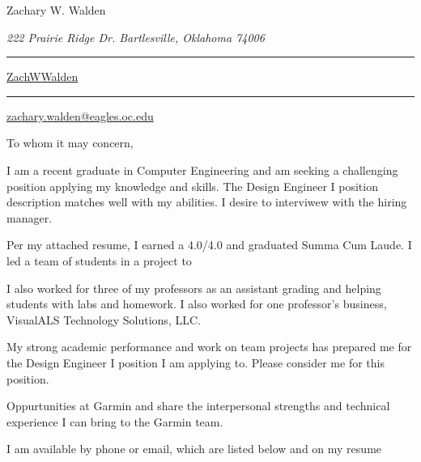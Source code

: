 \documentclass{article}
\newcommand\mybar{\kern1pt\rule[-\dp\strutbox]{.8pt}{\baselineskip}\kern1pt}
\begin{document}
\begin{center}
	\begin{Huge}
		Zachary W. Walden\\
	\end{Huge}
	\begin{large}
		\textsl{222 Prairie Ridge Dr. Bartlesville, Oklahoma 74006}\\
	\end{large}
	\begin{normalsize}
		 \mybar { } \faGithub \href{https://github.com/ZachWWalden}{ ZachWWalden}
		\mybar { }\faEnvelope\href{mailto::zachary.walden@eagles.oc.edu}{ zachary.walden@eagles.oc.edu}
	\end{normalsize}
\end{center}

\begin{adjustwidth}{70pt}{70pt}
\begin{spacing}{1.25}
\vspace*{\fill}

To whom it may concern,

I am a recent graduate in Computer Engineering and am seeking a challenging position applying my knowledge and skills.  The Design Engineer I position description matches well with my abilities. I desire to interviwew with the hiring manager.

Per my attached resume, I earned a 4.0/4.0 and graduated Summa Cum Laude. I led a team of students in a project to

I also worked for three of my professors as an assistant grading and helping students with labs and homework.  I also worked for one professor’s business, VisualALS Technology Solutions, LLC.

My strong academic performance and work on team projects has prepared me for the Design Engineer I position I am applying to.  Please consider me for this position.

Oppurtunities at Garmin and share the interpersonal strengths and technical experience I can bring to the Garmin team.

I am available by phone or email, which are listed below and on my resume
\vspace*{\fill}
\end{spacing}
\end{adjustwidth}

\newpage
\end{document}
